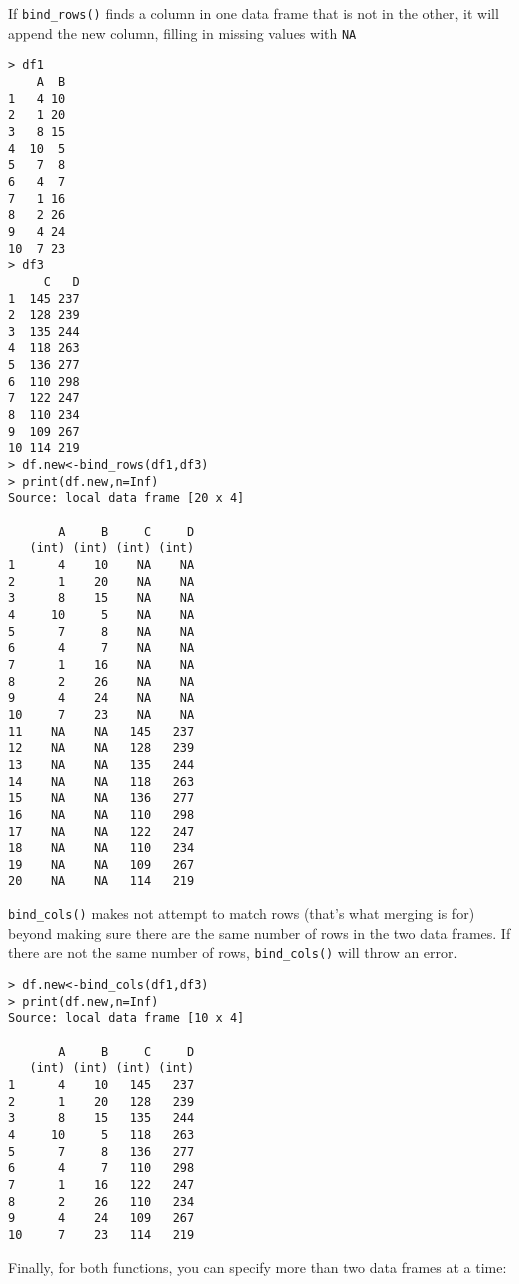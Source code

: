 \documentclass[12pt, oneside]{amsart}   	%
\begin{document}
If \texttt{bind\_rows()} finds a column in one data frame that is not in the other, it will append the new column, filling in missing values with \texttt{NA}

\begin{verbatim}
> df1
    A  B
1   4 10
2   1 20
3   8 15
4  10  5
5   7  8
6   4  7
7   1 16
8   2 26
9   4 24
10  7 23
> df3
     C   D
1  145 237
2  128 239
3  135 244
4  118 263
5  136 277
6  110 298
7  122 247
8  110 234
9  109 267
10 114 219
> df.new<-bind_rows(df1,df3)
> print(df.new,n=Inf)
Source: local data frame [20 x 4]

       A     B     C     D
   (int) (int) (int) (int)
1      4    10    NA    NA
2      1    20    NA    NA
3      8    15    NA    NA
4     10     5    NA    NA
5      7     8    NA    NA
6      4     7    NA    NA
7      1    16    NA    NA
8      2    26    NA    NA
9      4    24    NA    NA
10     7    23    NA    NA
11    NA    NA   145   237
12    NA    NA   128   239
13    NA    NA   135   244
14    NA    NA   118   263
15    NA    NA   136   277
16    NA    NA   110   298
17    NA    NA   122   247
18    NA    NA   110   234
19    NA    NA   109   267
20    NA    NA   114   219
\end{verbatim}

\texttt{bind\_cols()} makes not attempt to match rows (that's what merging is for) beyond making sure there are the same number of rows in the two data frames. If there are not the same number of rows, \texttt{bind\_cols()} will throw an error.

\begin{verbatim}
> df.new<-bind_cols(df1,df3)
> print(df.new,n=Inf)
Source: local data frame [10 x 4]

       A     B     C     D
   (int) (int) (int) (int)
1      4    10   145   237
2      1    20   128   239
3      8    15   135   244
4     10     5   118   263
5      7     8   136   277
6      4     7   110   298
7      1    16   122   247
8      2    26   110   234
9      4    24   109   267
10     7    23   114   219
\end{verbatim}

Finally, for both functions, you can specify more than two data frames at a time:
\end{document}
